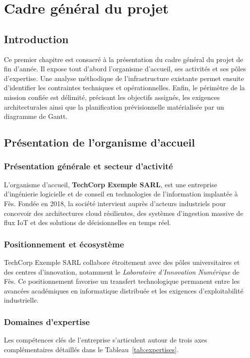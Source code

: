 \chapter{Cadre g\'en\'eral du projet}
\finPageTitre

\section{Introduction}
Ce premier chapitre est consacr\'e \`a la pr\'esentation du cadre g\'en\'eral du projet de fin d'ann\'ee. Il expose tout d'abord l'organisme d'accueil, ses activit\'es et ses p\^oles d'expertise. Une analyse m\'ethodique de l'infrastructure existante permet ensuite d'identifier les contraintes techniques et op\'erationnelles. Enfin, le p\'erim\`etre de la mission confi\'ee est d\'elimit\'e, pr\'ecisant les objectifs assign\'es, les exigences architecturales ainsi que la planification pr\'evisionnelle mat\'erialis\'ee par un diagramme de Gantt.

\section{Pr\'esentation de l'organisme d'accueil}
\subsection{Pr\'esentation g\'en\'erale et secteur d'activit\'e}
L'organisme d'accueil, \textbf{TechCorp Exemple SARL}, est une entreprise d'ing\'enierie logicielle et de conseil en technologies de l'information implant\'ee \`a F\`es. Fond\'ee en 2018, la soci\'et\'e intervient aupr\`es d'acteurs industriels pour concevoir des architectures cloud r\'esilientes, des syst\`emes d'ingestion massive de flux IoT et des solutions de d\'ecisionnelles en temps r\'eel.

\subsection{Positionnement et \'ecosyst\`eme}
TechCorp Exemple SARL collabore \'etroitement avec des p\^oles universitaires et des centres d'innovation, notamment le \textit{Laboratoire d'Innovation Num\'erique} de F\`es. Ce positionnement favorise un transfert technologique permanent entre les avanc\'ees acad\'emiques en informatique distribu\'ee et les exigences d'exploitabilit\'e industrielle.

\subsection{Domaines d'expertise}
Les comp\'etences cl\'es de l'entreprise s'articulent autour de trois axes compl\'ementaires d\'etaill\'es dans le Tableau~\ref{tab:expertises}.

